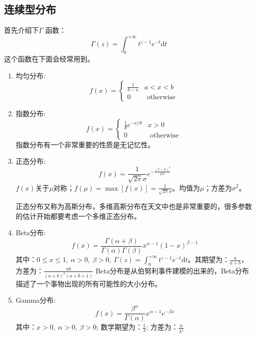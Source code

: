 \subsection{连续型分布}
首先介绍下$\Gamma$ 函数：
\begin{equation}
    \Gamma(z)=\int_{0}^{+\infty} t^{z-1} e^{-t} \mathrm{d} t
\end{equation}
这个函数在下面会经常用到。
\begin{enumerate}
\item 均匀分布: 
   \begin{equation}
        f(x)=\left\{\begin{array}{ll}\frac{1}{b-a} & a<x<b \\0 & \text { otherwise }\end{array}\right.
   \end{equation}
   
\item 指数分布: 
\begin{equation}
    f(x)=\left\{\begin{array}{ll}\frac{1}{\theta} e^{-x / \theta} & x>0 \\0 & \text { otherwise }\end{array}\right.
\end{equation}
指数分布有一个非常重要的性质是无记忆性。

\item 正态分布: 
\begin{equation}
    f(x)=\frac{1}{\sqrt{2 \pi} \sigma} e^{-\frac{(x-\mu)^{2}}{2 \sigma^{2}}}
\end{equation}
$f(x)$关于$\mu$对称；$f(\mu)=\max[f(x)]=\frac{1}{\sqrt{2\pi}\sigma}$。均值为$\mu$；方差为$\sigma ^2$。

正态分布又称为高斯分布，多维高斯分布在天文中也是非常重要的，很多参数的估计开始都要考虑一个多维正态分布。

\item  Beta分布: 
   \begin{equation}
    f(x)=\frac{\Gamma(\alpha+\beta)}{\Gamma(\alpha) \Gamma(\beta)} x^{\alpha-1}(1-x)^{\beta-1}
   \end{equation}
其中：$0\leq x\leq 1, \ \alpha>0,\ \beta>0,\ \Gamma(z)=\int_{0}^{+\infty} t^{z-1} e^{-t} \mathrm{d} t$。其期望为：$\frac{a}{a+b}$，方差为：$\frac{ab}{(a+b)^2(a+b+1)}$
Beta分布是从伯努利事件建模的出来的，Beta分布描述了一个事物出现的所有可能性的大小分布。

\item Gamma分布: 
\begin{equation}
   f(x)=\frac{\beta^{\alpha}}{\Gamma(\alpha)} x^{\alpha-1} e^{-\beta x}
\end{equation}
其中：$x>0,\ \alpha>0,\ \beta>0$; 数学期望为：$\frac{1}{\lambda}$; 方差为：$\frac{n}{\lambda ^2}$


\end{enumerate}
